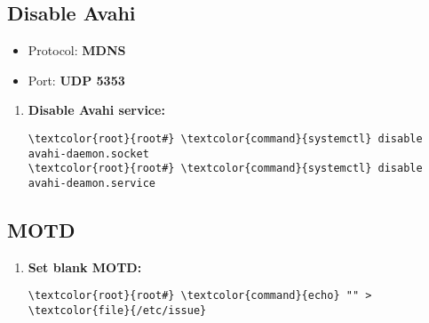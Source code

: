 \documentclass[10pt, a4paper, onecolumn, openany]{book} %
\begin{document}
\subsection{Disable Avahi}
\begin{itemize}
    \item Protocol: \textbf{MDNS}
    \item Port: \textbf{UDP 5353}
\end{itemize}
\begin{enumerate}
    \item \textbf{Disable Avahi service:}
\begin{Verbatim}[commandchars=\\\{\}]
\textcolor{root}{root#} \textcolor{command}{systemctl} disable avahi-daemon.socket
\textcolor{root}{root#} \textcolor{command}{systemctl} disable avahi-deamon.service
\end{Verbatim}
\end{enumerate}
\subsection{MOTD}
\begin{enumerate}
    \item \textbf{Set blank MOTD:}
\begin{Verbatim}[commandchars=\\\{\}]
\textcolor{root}{root#} \textcolor{command}{echo} "" > \textcolor{file}{/etc/issue}
\end{Verbatim}
\end{enumerate}
\end{document}
